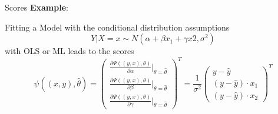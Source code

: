 \documentclass[9pt, xcolor=table]{beamer}
\begin{document}
\begin{frame}{Scores}
\textbf{Example}:

Fitting a Model with the conditional distribution assumptions
$$Y|X=x \sim N(\alpha + \beta x_{1} + \gamma x2, \sigma^2)$$
with OLS or ML leads to the scores
$$ \psi((x,y), \hat{\theta}) =  \left(\begin{array}{c} 
\frac{\partial \Psi((y,x), \theta)}{\partial \alpha} \big\rvert_{\theta = \hat{\theta}}\\ 
\frac{\partial \Psi((y,x), \theta)}{\partial \beta} \big\rvert_{\theta = \hat{\theta}} \\ 
\frac{\partial \Psi((y,x), \theta)}{\partial \gamma} \big\rvert_{\theta = \hat{\theta}}
\end{array}\right)^T =
\frac{1}{\sigma^2} 
\left(\begin{array}{c}
y-\hat{y} \\
(y-\hat{y}) \cdot x_{1} \\
(y-\hat{y}) \cdot x_{2}
\end{array}\right)^T
$$


\end{frame}
\end{document}
